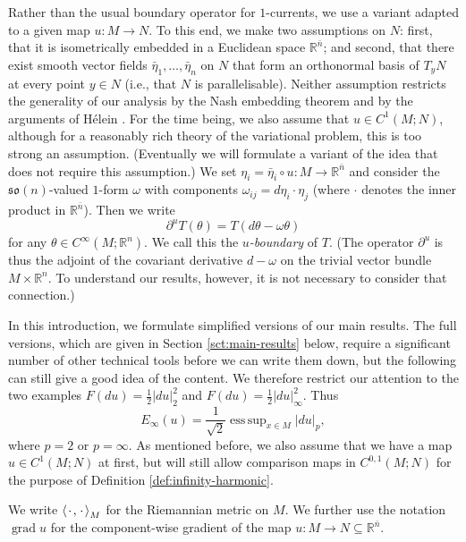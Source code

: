 \documentclass[a4paper]{article}
\newcommand{\R}{\mathbb{R}}
\newcommand{\ndim}{{\bar{n}}}
\DeclareMathOperator*{\esssup}{ess \, sup}
\DeclareMathOperator{\grad}{grad}
\newcommand{\blank}{{\mkern 2mu\cdot\mkern 2mu}}
\newcommand{\so}{\mathfrak{so}}
\newcommand{\scp}[2]{\left\langle #1, #2 \right\rangle}
\theoremstyle{definition}
\theoremstyle{remark}
\begin{document}
Rather than the usual boundary operator for $1$-currents, we use a variant adapted to a given map $u \colon M \to N$. To this end, we make two assumptions on $N$: first, that it is isometrically embedded in a Euclidean space $\R^\ndim$; and second, that there exist smooth vector fields $\bar{\eta}_1, \dotsc, \bar{\eta}_n$ on $N$ that form an orthonormal basis of $T_y N$ at every point $y \in N$ (i.e., that $N$ is parallelisable).
Neither assumption restricts the
generality of our analysis by the Nash embedding theorem \cite{Nash:56}
and by the arguments of H\'elein \cite{Helein:91.1}.
For the time being, we also assume that $u \in C^1(M; N)$, although for a reasonably rich theory of the variational problem,
this is too strong an assumption. (Eventually we will formulate a variant of
the idea that does not require this assumption.)
We set $\eta_i = \bar{\eta}_i \circ u \colon M \to \R^\ndim$ and consider the $\so(n)$-valued $1$-form $\omega$ with components
$\omega_{ij} = d\eta_i \cdot \eta_j$ (where $\cdot$ denotes the inner
product in $\R^\ndim$). Then we write
\[
\partial^u T(\theta) = T(d\theta - \omega \theta)
\]
for any $\theta \in C^\infty(M; \R^n)$.
We call this the \emph{$u$-boundary} of $T$. (The operator $\partial^u$ is
thus the adjoint of the covariant derivative $d - \omega$ on the trivial
vector bundle $M \times \R^n$.
To understand our results, however, it is not necessary to consider that connection.)

In this introduction, we formulate simplified versions of our main results.
The full versions, which are given in Section \ref{sct:main-results} below, require a significant
number of other technical tools before we can write them down, but the following can
still give a good idea of the content. We therefore restrict our attention to the two examples $F(du) = \frac{1}{2} |du|_2^2$ and $F(du) = \frac{1}{2} |du|_\infty^2$. Thus
\begin{equation} \label{eq:functional-simplified}
E_\infty(u) = \frac{1}{\sqrt{2}} \esssup_{x \in M} |du|_p,
\end{equation}
where $p = 2$ or $p = \infty$. As mentioned before, we also assume that
we have a map $u \in C^1(M; N)$ at first, but will still
allow comparison maps in $C^{0, 1}(M; N)$ for the purpose of
Definition \ref{def:infinity-harmonic}.

We write $\scp{\blank}{\blank}_M$ for the Riemannian metric on $M$.
We further use the notation $\grad u$ for the component-wise gradient
of the map $u \colon M \to N \subseteq \R^\ndim$.
\end{document}
